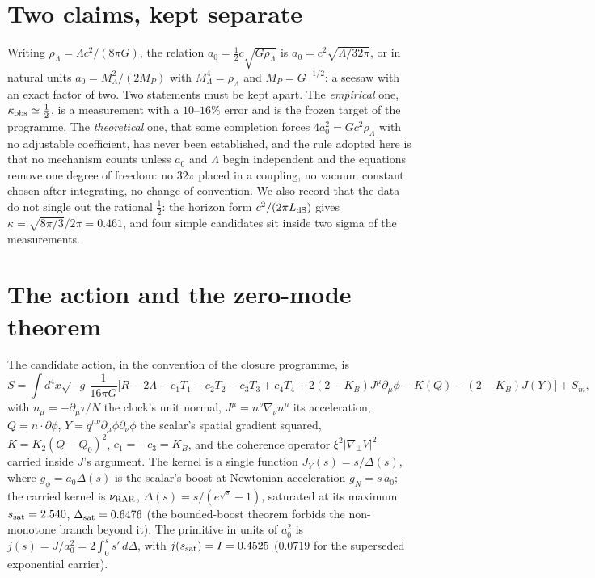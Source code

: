 \documentclass[11pt,letterpaper]{article}
\begin{document}
\section{Two claims, kept separate}
Writing $\rho_\Lambda=\Lambda c^2/(8\pi G)$, the relation $a_0=\tfrac12c\sqrt{G\rho_\Lambda}$ is $a_0=c^2\sqrt{\Lambda/32\pi}$, or in natural units $a_0=M_\Lambda^2/(2M_P)$ with $M_\Lambda^4=\rho_\Lambda$ and $M_P=G^{-1/2}$: a seesaw with an exact factor of two. Two statements must be kept apart. The \emph{empirical} one, $\kappa_{\rm obs}\simeq\tfrac12$, is a measurement with a $10$--$16\%$ error and is the frozen target of the programme. The \emph{theoretical} one, that some completion forces $4a_0^2=Gc^2\rho_\Lambda$ with no adjustable coefficient, has never been established, and the rule adopted here is that no mechanism counts unless $a_0$ and $\Lambda$ begin independent and the equations remove one degree of freedom: no $32\pi$ placed in a coupling, no vacuum constant chosen after integrating, no change of convention. We also record that the data do not single out the rational $\tfrac12$: the horizon form $c^2/(2\pi L_{\rm dS})$ gives $\kappa=\sqrt{8\pi/3}/2\pi=0.461$, and four simple candidates sit inside two sigma of the measurements.

\section{The action and the zero-mode theorem}
The candidate action, in the convention of the closure programme, is
\begin{equation}
S=\!\int\! d^4x\sqrt{-g}\,\frac{1}{16\pi G}\Big[R-2\Lambda-c_1T_1-c_2T_2-c_3T_3+c_4T_4+2(2-K_B)J^\mu\partial_\mu\phi-K(Q)-(2-K_B)J(Y)\Big]+S_m,
\end{equation}
with $n_\mu=-\partial_\mu\tau/N$ the clock's unit normal, $J^\mu=n^\nu\nabla_\nu n^\mu$ its acceleration, $Q=n\cdot\partial\phi$, $Y=q^{\mu\nu}\partial_\mu\phi\partial_\nu\phi$ the scalar's spatial gradient squared, $K=K_2(Q-Q_0)^2$, $c_1=-c_3=K_B$, and the coherence operator $\xi^2|\nabla_\perp V|^2$ carried inside $J$'s argument. The kernel is a single function $J_Y(s)=s/\Delta(s)$, where $g_\phi=a_0\Delta(s)$ is the scalar's boost at Newtonian acceleration $g_N=s\,a_0$; the carried kernel is $\nu_{\rm RAR}$, $\Delta(s)=s/(e^{\sqrt s}-1)$, saturated at its maximum $s_{\rm sat}=2.540$, $\Delta_{\rm sat}=0.6476$ (the bounded-boost theorem forbids the non-monotone branch beyond it). The primitive in units of $a_0^2$ is $j(s)=J/a_0^2=2\int_0^s s'\,d\Delta$, with $j(s_{\rm sat})=I=0.4525$ ($0.0719$ for the superseded exponential carrier).
\end{document}
